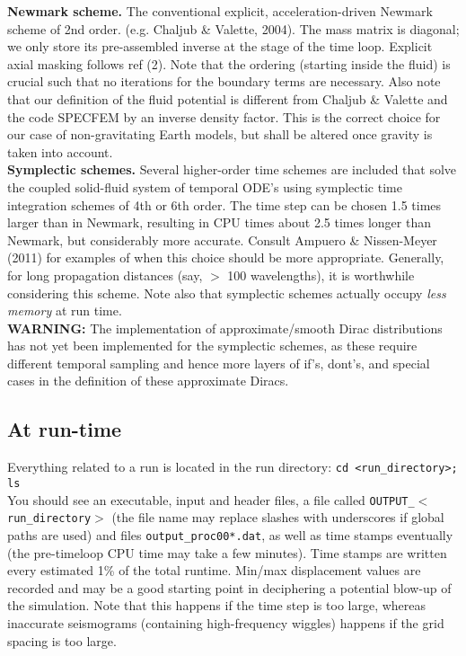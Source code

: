 \documentclass[11pt,letter,fleqn,english,notitlepage]{article}
\begin{document}
\noindent \textbf{Newmark scheme.}
 The conventional explicit, acceleration-driven Newmark scheme of 2nd order.
(e.g. Chaljub \& Valette, 2004). The mass matrix is diagonal; we only store 
 its pre-assembled inverse at the stage of the time loop.
 Explicit axial masking follows ref (2).
 Note that the ordering (starting inside the fluid) is crucial such that no 
 iterations for the boundary terms are necessary.
 Also note that our definition of the fluid potential is different from 
 Chaljub \& Valette and the code SPECFEM by an inverse density factor.
 This is the correct choice for our case of non-gravitating Earth models, 
 but shall be altered once gravity is taken into account.\\

\noindent \textbf{Symplectic schemes.}
Several higher-order time schemes are included that solve the 
coupled solid-fluid system of temporal ODE's
using symplectic time integration schemes of 4th or 6th order.
The time step can be chosen 1.5 times larger than in Newmark, resulting 
in CPU times about 2.5 times longer than Newmark, but considerably more 
accurate. Consult Ampuero \& Nissen-Meyer (2011) for examples of when 
this choice should be more appropriate. Generally, for long propagation 
distances (say, $>$ 100 wavelengths), it is worthwhile considering this scheme. 
Note also that symplectic schemes actually occupy \textit{less memory}
at run time.\\

\textbf{WARNING:} The implementation of approximate/smooth Dirac
distributions has not yet been implemented for the symplectic schemes,
as these require different temporal sampling and hence more layers of
if's, dont's, and special cases in the definition of these approximate Diracs.

\subsection{At run-time} 
Everything related to a run is located in the run directory: {\tt cd <run\_directory>; ls}\\
\noindent You should see an executable, input and 
header files, a file called {\tt OUTPUT\_$<$run\_directory$>$} (the file name may replace slashes 
with underscores if global paths are used) and files {\tt output\_proc00*.dat},
as well as time stamps eventually (the pre-timeloop CPU time may take a few 
minutes). Time stamps are written every estimated 1\% of the total runtime. 
Min/max displacement values are recorded and may be a good starting point in 
deciphering a potential blow-up of the simulation. Note that this happens if the time step 
is too large, whereas inaccurate seismograms (containing high-frequency wiggles) happens 
if the grid spacing is too large.
\end{document}
